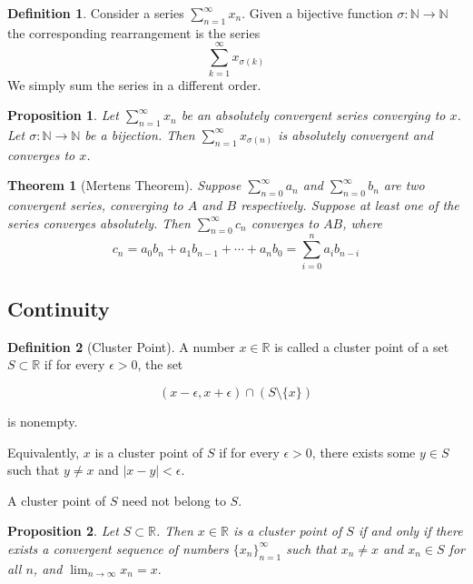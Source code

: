 \documentclass{article}
\newtheorem{theorem}{Theorem}[section]
\newtheorem{proposition}{Proposition}[section]
\theoremstyle{definition}
\newtheorem{definition}{Definition}[section]
\theoremstyle{remark}
\begin{document}
\begin{definition}
Consider a series $\sum^\infty_{n=1}{x_n}$. Given a bijective
function $\sigma: \mathbb{N} \to \mathbb{N}$ the corresponding rearrangement
is the series \[
\sum^\infty_{k=1}{x_{\sigma(k)}}
\]
We simply sum the series in a different order.
\end{definition}


\begin{proposition}
Let $\sum^\infty_{n=1}{x_n}$ be an absolutely convergent series converging to $x$. 
Let $\sigma: \mathbb{N}\to \mathbb{N}$ be a bijection. Then 
$\sum^\infty_{n=1}{x_{\sigma(n)}}$ is absolutely convergent and converges to $x$.
\end{proposition}


\begin{theorem}[Mertens Theorem]
Suppose $\sum^\infty_{n=0}{a_n}$ and $\sum^\infty_{n=0}{b_n}$
are two convergent series, converging to $A$ and $B$ respectively. Suppose at 
least one of the series converges absolutely. Then $\sum^\infty_{n=0}{c_n}$ converges
to $AB$, where 
\[
c_n = a_0b_n + a_1b_{n-1} + \cdots + a_nb_0 = \sum^n_{i=0}{a_ib_{n-i}}
\]

\end{theorem}

\subsection{Continuity}





\begin{definition}[Cluster Point]\label{def:cluster_point}
A number \( x \in \mathbb{R} \) is called a cluster point of a set \( S \subset \mathbb{R} \) if for every \( \epsilon > 0 \), the set  

\[
(x - \epsilon, x + \epsilon) \cap (S \setminus \{x\})
\]

is nonempty.  

Equivalently, \( x \) is a cluster point of \( S \) if for every \( \epsilon > 0 \), there exists some \( y \in S \) such that \( y \neq x \) and \( |x - y| < \epsilon \).  

A cluster point of \( S \) need not belong to \( S \).
\end{definition}


\begin{proposition}
Let $S \subset \mathbb{R}$. Then $x \in \mathbb{R}$ is a cluster point of $S$ if and only if there exists a convergent sequence of numbers $\{x_n\}_{n=1}^{\infty}$ such that $x_n \neq x$ and $x_n \in S$ for all $n$, and 
\(
\lim_{n\to\infty} x_n = x.
\)
\end{proposition}
\end{document}
